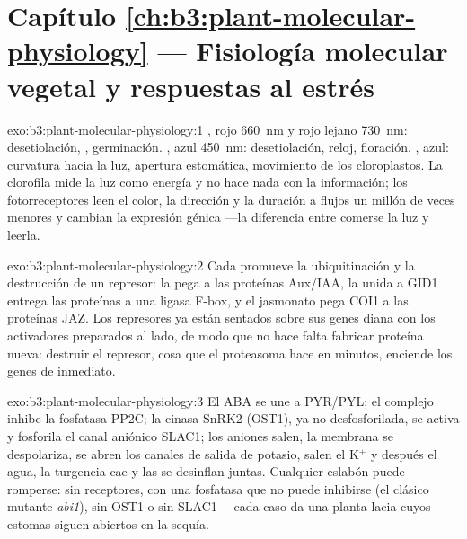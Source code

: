 \section*{Capítulo \ref{ch:b3:plant-molecular-physiology} --- Fisiología molecular vegetal y respuestas al estrés}

\begin{solution}{exo:b3:plant-molecular-physiology:1}
, rojo \qty{660}{nm} y rojo lejano \qty{730}{nm}:
desetiolación, , germinación. , azul
\qty{450}{nm}: desetiolación, reloj, floración. , azul:
curvatura hacia la luz, apertura estomática, movimiento de los
cloroplastos. La clorofila mide la luz como energía y no hace nada con
la información; los fotorreceptores leen el color, la dirección y la
duración a flujos un millón de veces menores y cambian la expresión
génica ---la diferencia entre comerse la luz y leerla.
\end{solution}

\begin{solution}{exo:b3:plant-molecular-physiology:2}
Cada  promueve la ubiquitinación y la destrucción de un
represor: la  pega  a las proteínas Aux/IAA, la 
unida a GID1 entrega las proteínas  a una ligasa F-box, y el
jasmonato pega COI1 a las proteínas JAZ. Los represores ya están
sentados sobre sus genes diana con los activadores preparados al lado,
de modo que no hace falta fabricar proteína nueva: destruir el
represor, cosa que el proteasoma hace en minutos, enciende los genes de
inmediato.
\end{solution}

\begin{solution}{exo:b3:plant-molecular-physiology:3}
El ABA se une a PYR/PYL; el complejo inhibe la fosfatasa PP2C; la
cinasa SnRK2 (OST1), ya no desfosforilada, se activa y fosforila el
canal aniónico SLAC1; los aniones salen, la membrana se despolariza,
se abren los canales de salida de potasio, salen el K$^{+}$ y después
el agua, la turgencia cae y las  se desinflan juntas.
Cualquier eslabón puede romperse: sin receptores, con una fosfatasa que
no puede inhibirse (el clásico mutante \emph{abi1}), sin OST1 o sin
SLAC1 ---cada caso da una planta lacia cuyos estomas siguen abiertos en
la sequía.
\end{solution}

